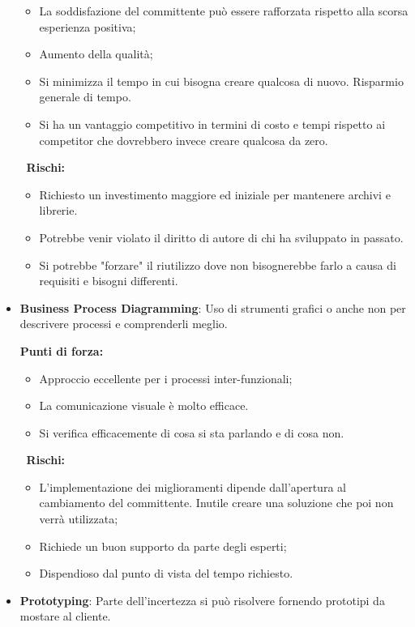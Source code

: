 \begin{itemize}
\begin{info}[]
\begin{itemize}
			\item La soddisfazione del committente può essere rafforzata rispetto alla scorsa esperienza positiva;
			\item Aumento della qualità;
			\item Si minimizza il tempo in cui bisogna creare qualcosa di nuovo. Risparmio generale di tempo.
			\item Si ha un vantaggio competitivo in termini di costo e tempi rispetto ai competitor che dovrebbero invece creare qualcosa da zero.
		\end{itemize}
		$\;\;$\textbf{Rischi:}
		\begin{itemize}
			\item Richiesto un investimento maggiore ed iniziale per mantenere archivi e librerie.
			\item Potrebbe venir violato il diritto di autore di chi ha sviluppato in passato.
			\item Si potrebbe "forzare" il riutilizzo dove non bisognerebbe farlo a causa di requisiti e bisogni differenti.
		\end{itemize}
	\end{info}
	\item \textbf{Business Process Diagramming}: Uso di strumenti grafici o anche non per descrivere processi e comprenderli meglio.
	\begin{info}[]
		\textbf{Punti di forza:}
		\begin{itemize}
			\item Approccio eccellente per i processi inter-funzionali;
			\item La comunicazione visuale è molto efficace.
			\item Si verifica efficacemente di cosa si sta parlando e di cosa non.
		\end{itemize}
		$\;\;$\textbf{Rischi:}
		\begin{itemize}
			\item L'implementazione dei miglioramenti dipende dall'apertura al cambiamento del committente. Inutile creare una soluzione che poi non verrà utilizzata;
			\item Richiede un buon supporto da parte degli esperti;
			\item Dispendioso dal punto di vista del tempo richiesto.
		\end{itemize}
	\end{info}
	\item \textbf{Prototyping}: Parte dell'incertezza si può risolvere fornendo prototipi da mostare al cliente.

\end{itemize}

